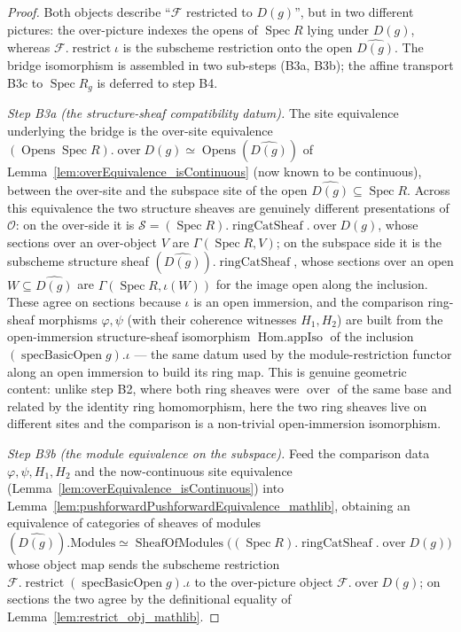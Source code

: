 \begin{proof}
    \leanok
  Both objects describe ``\(\mathcal{F}\) restricted to \(D(g)\)'', but in two different pictures: the
  over-picture indexes the opens of \(\operatorname{Spec} R\) lying under \(D(g)\), whereas
  \(\mathcal{F}.\operatorname{restrict} \iota\) is the subscheme restriction onto the open
  \(\widehat{D(g)}\). The bridge isomorphism is assembled in two sub-steps (B3a, B3b); the affine
  transport B3c to \(\operatorname{Spec} R_g\) is deferred to step B4.

  \emph{Step B3a (the structure-sheaf compatibility datum).} The site equivalence underlying the bridge
  is the over-site equivalence
  \((\operatorname{Opens} \operatorname{Spec} R).\operatorname{over} D(g) \simeq
  \operatorname{Opens}(\widehat{D(g)})\) of Lemma~\ref{lem:overEquivalence_isContinuous} (now known to be
  continuous), between the over-site and the subspace site of the open
  \(\widehat{D(g)} \subseteq \operatorname{Spec} R\). Across this equivalence the two structure sheaves
  are genuinely different presentations of \(\mathcal{O}\): on the over-side it is
  \(\mathcal{S} = (\operatorname{Spec} R).\operatorname{ringCatSheaf}.\operatorname{over} D(g)\), whose
  sections over an over-object \(V\) are \(\Gamma(\operatorname{Spec} R, V)\); on the subspace side it is
  the subscheme structure sheaf \((\widehat{D(g)}).\operatorname{ringCatSheaf}\), whose sections over an
  open \(W \subseteq \widehat{D(g)}\) are \(\Gamma(\operatorname{Spec} R, \iota(W))\) for the image open
  along the inclusion. These agree on sections because \(\iota\) is an open immersion, and the
  comparison ring-sheaf morphisms \(\varphi, \psi\) (with their coherence witnesses \(H_1, H_2\)) are
  built from the open-immersion structure-sheaf isomorphism \(\operatorname{Hom.appIso}\) of the
  inclusion \((\operatorname{specBasicOpen} g).\iota\) — the same datum used by the
  module-restriction functor along an open immersion to build its ring map. This is genuine
  geometric content: unlike step B2, where both ring sheaves were \(\operatorname{over}\) of the same
  base and related by the identity ring homomorphism, here the two ring sheaves live on
  different sites and the comparison is a non-trivial open-immersion isomorphism.

  \emph{Step B3b (the module equivalence on the subspace).} Feed the comparison data
  \(\varphi, \psi, H_1, H_2\) and the now-continuous site equivalence
  (Lemma~\ref{lem:overEquivalence_isContinuous}) into
  Lemma~\ref{lem:pushforwardPushforwardEquivalence_mathlib}, obtaining an equivalence of categories of
  sheaves of modules
  \((\widehat{D(g)}).\mathrm{Modules} \simeq \operatorname{SheafOfModules}
  \bigl((\operatorname{Spec} R).\operatorname{ringCatSheaf}.\operatorname{over} D(g)\bigr)\)
  whose object map sends the subscheme restriction
  \(\mathcal{F}.\operatorname{restrict} (\operatorname{specBasicOpen} g).\iota\) to the over-picture
  object \(\mathcal{F}.\operatorname{over} D(g)\); on sections the two agree by the definitional equality
  of Lemma~\ref{lem:restrict_obj_mathlib}.


\end{proof}
